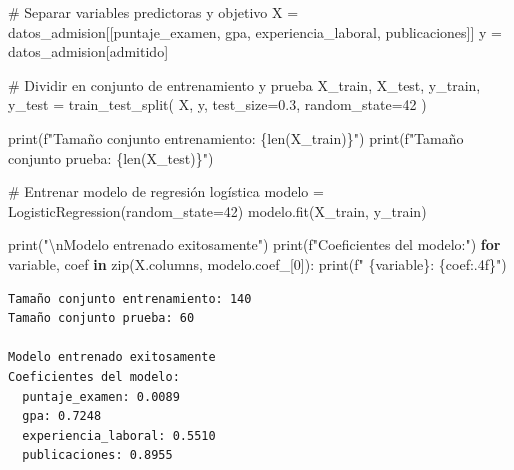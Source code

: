 \documentclass[
  doc,
  floatsintext,
  longtable,
  a4paper,
  nolmodern,
  notxfonts,
  notimes,
  12pt,
  colorlinks=true,linkcolor=blue,citecolor=blue,urlcolor=blue]{apa7}
\newenvironment{Shaded}{\begin{snugshade}}{\end{snugshade}}
\newcommand{\BuiltInTok}[1]{\textcolor[rgb]{0.00,0.23,0.31}{#1}}
\newcommand{\CharTok}[1]{\textcolor[rgb]{0.13,0.47,0.30}{#1}}
\newcommand{\CommentTok}[1]{\textcolor[rgb]{0.37,0.37,0.37}{#1}}
\newcommand{\ControlFlowTok}[1]{\textcolor[rgb]{0.00,0.23,0.31}{\textbf{#1}}}
\newcommand{\DecValTok}[1]{\textcolor[rgb]{0.68,0.00,0.00}{#1}}
\newcommand{\FloatTok}[1]{\textcolor[rgb]{0.68,0.00,0.00}{#1}}
\newcommand{\KeywordTok}[1]{\textcolor[rgb]{0.00,0.23,0.31}{\textbf{#1}}}
\newcommand{\NormalTok}[1]{\textcolor[rgb]{0.00,0.23,0.31}{#1}}
\newcommand{\OperatorTok}[1]{\textcolor[rgb]{0.37,0.37,0.37}{#1}}
\newcommand{\SpecialCharTok}[1]{\textcolor[rgb]{0.37,0.37,0.37}{#1}}
\newcommand{\SpecialStringTok}[1]{\textcolor[rgb]{0.13,0.47,0.30}{#1}}
\newcommand{\StringTok}[1]{\textcolor[rgb]{0.13,0.47,0.30}{#1}}
\begin{document}
\begin{Shaded}
\begin{Highlighting}[]
\CommentTok{\# Separar variables predictoras y objetivo}
\NormalTok{X }\OperatorTok{=}\NormalTok{ datos\_admision[[}\StringTok{\textquotesingle{}puntaje\_examen\textquotesingle{}}\NormalTok{, }\StringTok{\textquotesingle{}gpa\textquotesingle{}}\NormalTok{, }\StringTok{\textquotesingle{}experiencia\_laboral\textquotesingle{}}\NormalTok{, }\StringTok{\textquotesingle{}publicaciones\textquotesingle{}}\NormalTok{]]}
\NormalTok{y }\OperatorTok{=}\NormalTok{ datos\_admision[}\StringTok{\textquotesingle{}admitido\textquotesingle{}}\NormalTok{]}

\CommentTok{\# Dividir en conjunto de entrenamiento y prueba}
\NormalTok{X\_train, X\_test, y\_train, y\_test }\OperatorTok{=}\NormalTok{ train\_test\_split(}
\NormalTok{    X, y, test\_size}\OperatorTok{=}\FloatTok{0.3}\NormalTok{, random\_state}\OperatorTok{=}\DecValTok{42}
\NormalTok{)}

\BuiltInTok{print}\NormalTok{(}\SpecialStringTok{f"Tamaño conjunto entrenamiento: }\SpecialCharTok{\{}\BuiltInTok{len}\NormalTok{(X\_train)}\SpecialCharTok{\}}\SpecialStringTok{"}\NormalTok{)}
\BuiltInTok{print}\NormalTok{(}\SpecialStringTok{f"Tamaño conjunto prueba: }\SpecialCharTok{\{}\BuiltInTok{len}\NormalTok{(X\_test)}\SpecialCharTok{\}}\SpecialStringTok{"}\NormalTok{)}

\CommentTok{\# Entrenar modelo de regresión logística}
\NormalTok{modelo }\OperatorTok{=}\NormalTok{ LogisticRegression(random\_state}\OperatorTok{=}\DecValTok{42}\NormalTok{)}
\NormalTok{modelo.fit(X\_train, y\_train)}

\BuiltInTok{print}\NormalTok{(}\StringTok{"}\CharTok{\textbackslash{}n}\StringTok{Modelo entrenado exitosamente"}\NormalTok{)}
\BuiltInTok{print}\NormalTok{(}\SpecialStringTok{f"Coeficientes del modelo:"}\NormalTok{)}
\ControlFlowTok{for}\NormalTok{ variable, coef }\KeywordTok{in} \BuiltInTok{zip}\NormalTok{(X.columns, modelo.coef\_[}\DecValTok{0}\NormalTok{]):}
    \BuiltInTok{print}\NormalTok{(}\SpecialStringTok{f"  }\SpecialCharTok{\{}\NormalTok{variable}\SpecialCharTok{\}}\SpecialStringTok{: }\SpecialCharTok{\{}\NormalTok{coef}\SpecialCharTok{:.4f\}}\SpecialStringTok{"}\NormalTok{)}
\end{Highlighting}
\end{Shaded}

\begin{verbatim}
Tamaño conjunto entrenamiento: 140
Tamaño conjunto prueba: 60

Modelo entrenado exitosamente
Coeficientes del modelo:
  puntaje_examen: 0.0089
  gpa: 0.7248
  experiencia_laboral: 0.5510
  publicaciones: 0.8955
\end{verbatim}
\end{document}
